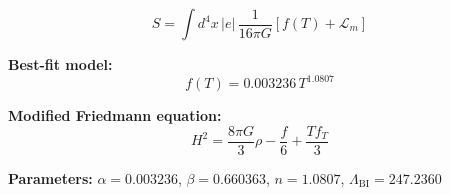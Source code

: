 
\begin{equation}
  S = \int d^4x \, |e| \, \frac{1}{16\pi G} \left[ f(T) + \mathcal{L}_m \right]
\end{equation}

\textbf{Best-fit model:}
\begin{equation}
  f(T) = 0.003236 \, T^{1.0807}
\end{equation}

\textbf{Modified Friedmann equation:}
\begin{equation}
  H^2 = \frac{8\pi G}{3} \rho - \frac{f}{6} + \frac{T f_T}{3}
\end{equation}

\textbf{Parameters:}
$\alpha = 0.003236$, \quad
$\beta = 0.660363$, \quad
$n = 1.0807$, \quad
$\Lambda_{\text{BI}} = 247.2360$